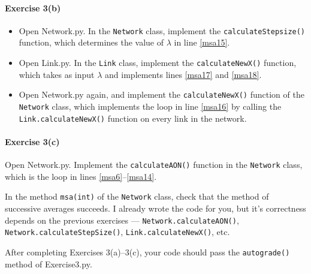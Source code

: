 \documentclass[11pt]{article}
\begin{document}
\paragraph*{Exercise 3(b)} 
\begin{itemize}
	\item Open Network.py. In the \texttt{Network} class, implement the \texttt{calculateStepsize()} function, which determines the value of $\lambda$ in line \ref{msa15}. 
	
	\item Open Link.py. In the \texttt{Link} class, implement the \texttt{calculateNewX()} function, which takes as input $\lambda$ and implements lines \ref{msa17} and \ref{msa18}. 
	
	\item Open Network.py again, and implement the \texttt{calculateNewX()} function of the \texttt{Network} class, which implements the loop in line \ref{msa16} by calling the \texttt{Link.calculateNewX()} function on every link in the network.
\end{itemize}



\paragraph*{Exercise 3(c)} Open Network.py. Implement the \texttt{calculateAON()} function in the \texttt{Network} class, which is the loop in lines \ref{msa6}--\ref{msa14}. 

In the method \texttt{msa(int)} of the \texttt{Network} class, check that  the method of successive averages succeeds. I already wrote the code for you, but it's correctness depends on  the previous exercises --- \texttt{Network.calculateAON()},  \texttt{Network.calculateStepSize()}, \texttt{Link.calculateNewX()}, etc. 


\vspace\baselineskip

	\noindent
	After completing Exercises 3(a)--3(c), your code should pass the \texttt{autograde()} method of Exercise3.py. 
	
	
	
	
	
\end{document}
